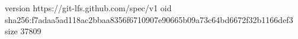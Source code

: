 version https://git-lfs.github.com/spec/v1
oid sha256:f7adaa5ad118ac2bbaa8356f6710907e90665b09a73c64bd6672f32b1166def3
size 37809
